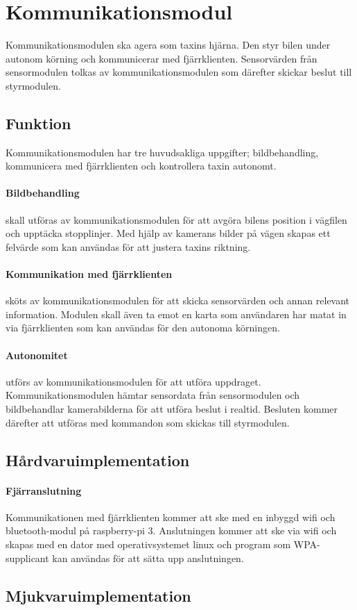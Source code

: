 \documentclass[designspec/spec.tex]{subfiles}
\begin{document}
\section{Kommunikationsmodul}
Kommunikationsmodulen ska agera som taxins hjärna. Den styr bilen under autonom
körning och kommunicerar med fjärrklienten. Sensorvärden från sensormodulen
tolkas av kommunikationsmodulen som därefter skickar beslut till styrmodulen.

\subsection{Funktion}
Kommunikationsmodulen har tre huvudsakliga uppgifter; bildbehandling,
kommunicera med fjärrklienten och kontrollera taxin autonomt.

\paragraph{Bildbehandling} skall utföras av kommunikationsmodulen för att
avgöra bilens position i vägfilen och upptäcka stopplinjer. Med hjälp av
kamerans bilder på vägen skapas ett felvärde som kan användas för att justera
taxins riktning.

\paragraph{Kommunikation med fjärrklienten} sköts av kommunikationsmodulen för
att skicka sensorvärden och annan relevant information. Modulen skall även ta
emot en karta som användaren har matat in via fjärrklienten som kan användas
för den autonoma körningen.

\paragraph{Autonomitet} utförs av kommunikationsmodulen för att utföra
uppdraget. Kommunikationsmodulen hämtar sensordata från sensormodulen och
bildbehandlar kamerabilderna för att utföra beslut i realtid. Besluten kommer
därefter att utföras med kommandon som skickas till styrmodulen.

\subsection{Hårdvaruimplementation} 
\paragraph{Fjärranslutning}
Kommunikationen med fjärrklienten kommer att ske med en inbyggd wifi och
bluetooth-modul på raspberry-pi 3. Anslutningen kommer att ske via wifi och skapas med en dator
med operativsystemet linux och program som WPA-supplicant kan användas för att
sätta upp anslutningen.
\subsection{Mjukvaruimplementation}
\end{document}
